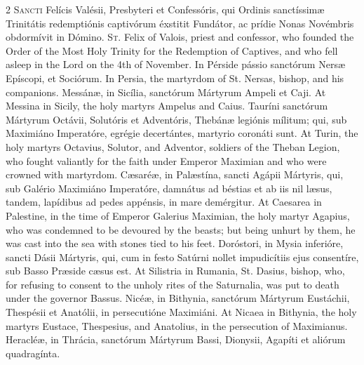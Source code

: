 \begin{paracol}{2}
\lettrine[lines=2]{S}{ancti} Felícis Valésii, 
 Presbyteri et Confessóris, qui Ordinis sanctíssimæ Trinitátis redemptiónis 
 captivórum éxstitit Fundátor, ac prídie Nonas Novémbris obdormívit in 
 Dómino.
\switchcolumn
{}
\lettrine[lines=2]{S}{t.} Felix of Valois, priest and 
 confessor, who founded the Order of the Most Holy Trinity for the Redemption 
 of Captives, and who fell asleep in the Lord on the 4th of November.
\switchcolumn*
{}
In Pérside pássio 
 sanctórum Nersæ Epíscopi, et Sociórum.
\switchcolumn
{}
In Persia, the martyrdom of St. 
 Nersas, bishop, and his companions.
\switchcolumn*
{}
Messánæ, in Sicília, 
 sanctórum Mártyrum Ampeli et Caji.
\switchcolumn
{}
At Messina in Sicily, the holy 
 martyrs Ampelus and Caius.
\switchcolumn*
{}
Tauríni sanctórum 
 Mártyrum Octávii, Solutóris et Adventóris, Thebánæ legiónis mílitum; qui, 
 sub Maximiáno Imperatóre, egrégie decertántes, martyrio coronáti sunt.
\switchcolumn
{}
At Turin, the holy martyrs Octavius, 
 Solutor, and Adventor, soldiers of the Theban Legion, who fought valiantly 
 for the faith under Emperor Maximian and who were crowned with martyrdom.
\switchcolumn*
{}
Cæsaréæ, in Palæstína, 
 sancti Agápii Mártyris, qui, sub Galério Maximiáno Imperatóre, damnátus ad 
 béstias et ab iis nil læsus, tandem, lapídibus ad pedes appénsis, in mare 
 demérgitur.
\switchcolumn
{}
At Caesarea in Palestine, in the 
 time of Emperor Galerius Maximian, the holy martyr Agapius, who was 
 condemned to be devoured by the beasts; but being unhurt by them, he was 
 cast into the sea with stones tied to his feet.
\switchcolumn*
{}
Doróstori, in Mysia inferióre, sancti Dásii Mártyris, qui, cum in festo Satúrni
	nollet impudicítiis ejus consentíre, sub Basso Præside cæsus est.
\switchcolumn
{}
At Silistria in Rumania, St. Dasius, 
 bishop, who, for refusing to consent to the unholy rites of the Saturnalia, 
 was put to death under the governor Bassus.
\switchcolumn*
{}
Nicéæ, in Bithynia, sanctórum Mártyrum Eustáchii, Thespésii et Anatólii, in
persecutióne Maximiáni.
\switchcolumn
{}
At Nicaea in Bithynia, the holy 
 martyrs Eustace, Thespesius, and Anatolius, in the persecution of Maximianus.
\switchcolumn*
{}
Heracléæ, in Thrácia, 
 sanctórum Mártyrum Bassi, Dionysii, Agapíti et aliórum quadragínta.

\end{paracol}
